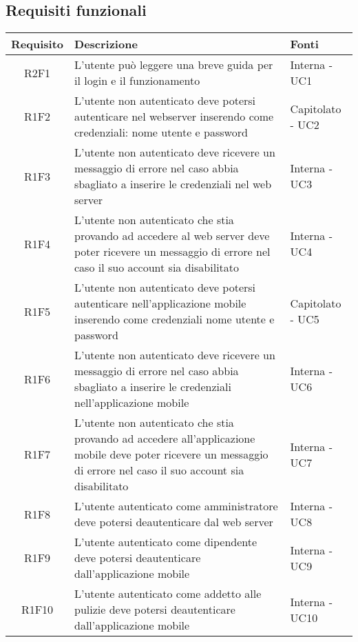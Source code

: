 \subsection{Requisiti funzionali}
\begin{center}
	\begin{longtable}{|c|p{10cm}|p{4cm}|}
		\hline
		\rowcolor{lighter-grayer}
		\textbf{Requisito} & \textbf{Descrizione} & \textbf{Fonti}  \\
		\hline
		\endhead
		
		
		 R2F1 & L'utente può leggere una breve guida per il login e il funzionamento & Interna - UC1 \\
		\hline
		R1F2	&	L'utente non autenticato deve potersi autenticare nel webserver inserendo come credenziali: nome utente e password & Capitolato - UC2	\\
		\hline
		R1F3	&	L'utente non autenticato deve ricevere un messaggio di errore nel caso abbia sbagliato a inserire le credenziali nel web server& Interna - UC3	\\
		\hline
		R1F4	&	L'utente non autenticato che stia provando ad accedere al web server deve poter ricevere un messaggio di errore nel caso il suo account sia disabilitato& Interna - UC4	\\
		\hline
		R1F5	&	L'utente non autenticato deve potersi autenticare nell'applicazione mobile inserendo come credenziali nome utente e password & Capitolato - UC5	\\
		\hline
		R1F6	&	L'utente non autenticato deve ricevere un messaggio di errore nel caso abbia sbagliato a inserire le credenziali nell'applicazione mobile& Interna - UC6	\\
		\hline
		R1F7	&	L'utente non autenticato che stia provando ad accedere all'applicazione mobile deve poter ricevere un messaggio di errore nel caso il suo account sia disabilitato& Interna - UC7	\\
		\hline
		R1F8	&	L'utente autenticato come amministratore deve potersi deautenticare dal web server& Interna - UC8	\\
		\hline
		R1F9	&	L'utente autenticato come dipendente deve potersi deautenticare dall'applicazione mobile& Interna - UC9	\\
		\hline
		R1F10	&	L'utente autenticato come addetto alle pulizie deve potersi deautenticare dall'applicazione mobile& Interna - UC10	\\

\end{longtable}
\end{center}

